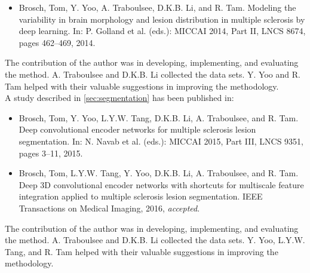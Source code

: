\begin{itemize}
\item Brosch, Tom, Y. Yoo, A. Traboulsee, D.K.B. Li, and R. Tam. Modeling the
variability in brain morphology and lesion distribution in multiple sclerosis by
deep learning. In: P. Golland et al. (eds.): MICCAI 2014, Part II, LNCS 8674,
pages 462--469, 2014.
\end{itemize}
The contribution of the author was in developing, implementing, and evaluating
the method. A. Traboulsee and D.K.B. Li collected the data sets. Y. Yoo and R.
Tam helped with their valuable suggestions in improving the methodology.
\\[1em]
A study described in \ref{sec:segmentation} has been published in:
\begin{itemize}
\item Brosch, Tom, Y. Yoo, L.Y.W. Tang, D.K.B. Li, A. Traboulsee, and R. Tam.
Deep convolutional encoder networks for multiple sclerosis lesion segmentation.
In: N. Navab et al. (eds.): MICCAI 2015, Part III, LNCS 9351, pages 3--11, 2015.
\item Brosch, Tom, L.Y.W. Tang, Y. Yoo, D.K.B. Li, A. Traboulsee, and R. Tam.
Deep 3D convolutional encoder networks with shortcuts for multiscale feature
integration applied to multiple sclerosis lesion segmentation. IEEE Transactions
on Medical Imaging, 2016, \emph{accepted}.
\end{itemize}
The contribution of the author was in developing, implementing, and evaluating
the method. A. Traboulsee and D.K.B. Li collected the data sets. Y. Yoo, L.Y.W.
Tang, and R. Tam helped with their valuable suggestions in improving the
methodology.
